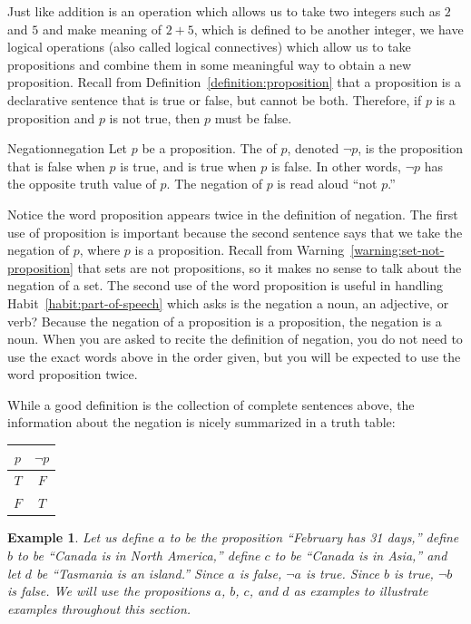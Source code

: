 \documentclass{book}
\newcounter{ekcounter}%
\theoremstyle{ekimcustom}
\newtheorem{example}[ekcounter]{Example}
\newcommand\defn[1]{{\color{blue}{\bf #1}}}
\begin{document}
Just like addition is an operation which allows us to take two integers such as $2$ and $5$ and make meaning of $2+5$, which is defined to be another integer, we have logical operations (also called logical connectives) which allow us to take propositions and combine them in some meaningful way to obtain a new proposition. Recall from Definition~\ref{definition:proposition} that a proposition is a declarative sentence that is true or false, but cannot be both. Therefore, if $p$ is a proposition and $p$ is not true, then $p$ must be false.
\begin{bdefinition}{Negation}{negation}
Let $p$ be a proposition. The \defn{negation} of $p$, denoted $\neg p$, is the proposition that is false when $p$ is true, and is true when $p$ is false. In other words, $\neg p$ has the opposite truth value of $p$. The negation of $p$ is read aloud ``not $p$.''
\end{bdefinition}
Notice the word proposition appears twice in the definition of negation. The first use of proposition is important because the second sentence says that we take the negation of $p$, where $p$ is a proposition. Recall from Warning~\ref{warning:set-not-proposition} that sets are not propositions, so it makes no sense to talk about the negation of a set. The second use of the word proposition is useful in handling Habit~\ref{habit:part-of-speech} which asks is the negation a noun, an adjective, or verb? Because the negation of a proposition is a proposition, the negation is a noun. When you are asked to recite the definition of negation, you do not need to use the exact words above in the order given, but you will be expected to use the word proposition twice.

While a good definition is the collection of complete sentences above, the information about the negation is nicely summarized in a truth table:
\begin{center}
\begin{tabular}{c||c}
$p$ & $\neg p$ \\\hline
$T$ & $F$ \\
$F$ & $T$
\end{tabular}
\end{center}

\begin{example}\label{example:props-abcd}
Let us define $a$ to be the proposition ``February has 31 days,'' define $b$ to be ``Canada is in North America,'' define $c$ to be ``Canada is in Asia,'' and let $d$ be ``Tasmania is an island.'' Since $a$ is false, $\neg a$ is true. Since $b$ is true, $\neg b$ is false. We will use the propositions $a$, $b$, $c$, and $d$ as examples to illustrate examples throughout this section.
\end{example}
\end{document}
